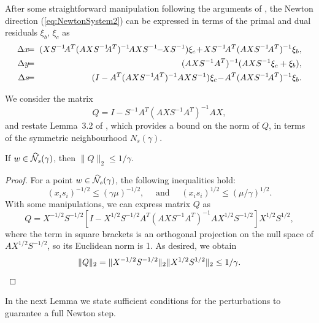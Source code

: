 After some straightforward manipulation following the arguments of 
\cite{GondzioGrothey03}, the Newton
direction (\ref{eq:NewtonSystem2}) can be expressed in terms 
of the primal and dual residuals $\xi_b$, $\xi_c$ as
%
\begin{eqnarray}  \label{eq:Directions}
  \Delta x & \hspace{-1ex} = \hspace{-1ex} & 
  (XS^{-1} \! A^T (AXS^{-1} \!\! A^T)^{-1} \! AXS^{-1} \!\!-\!\! XS^{-1} )\xi_c
  \! + \! XS^{-1} \! A^T (AXS^{-1} \! A^T)^{-1} \xi_b, \nonumber \\
  \Delta y & \hspace{-1ex} = \hspace{-1ex} & 
  (AXS^{-1} A^T)^{-1} (AXS^{-1} \xi_c + \xi_b),                  \\
  \Delta s & \hspace{-1ex} = \hspace{-1ex} & 
  (I - A^T (AXS^{-1} \! A^T)^{-1} AXS^{-1} )\xi_c 
  \! - \! A^T (AXS^{-1} \! A^T)^{-1} \xi_b.            \nonumber
\end{eqnarray}

We consider the matrix
\[
  Q = I - S^{-1} A^T (A X S^{-1} A^T)^{-1} A X,
\]
and restate Lemma~3.2 of \cite{GondzioGrothey03},
which provides a bound on the norm of $Q$, in terms of
the symmetric neighbourhood $N_s(\gamma)$.

\begin{lemma}  \label{th:BoundQ}
If $w \in \widehat{\mathcal{N}}_s(\gamma)$, then $\|Q\|_2 \le 1/\gamma$.
\end{lemma}
%
\begin{proof}
For a point $w \in \widehat{\mathcal{N}}_s(\gamma)$, 
the following inequalities hold:
\[
  (x_i s_i)^{-1/2} \le (\gamma\mu)^{-1/2},
  \quad \mbox{ and } \quad
  (x_i s_i)^{1/2} \le (\mu / \gamma)^{1/2}.
\]
With some manipulations, we can express matrix $Q$ as
\[
Q = X^{-1/2}S^{-1/2} \left[ I - X^{1/2}S^{-1/2}A^T(AXS^{-1}A^T)^{-1}AX^{1/2}S^{-1/2} \right] X^{1/2}S^{1/2},
\]
where the term in square brackets is an orthogonal projection on the null
space of $AX^{1/2}S^{-1/2}$, so its Euclidean norm is 1.
As desired, we obtain
\[
  \| Q \|_2 = \| X^{-1/2}S^{-1/2} \|_2 \| X^{1/2}S^{1/2} \|_2 \le 1/\gamma.
  \qedhere
\]
\end{proof}

In the next Lemma we state sufficient conditions for the perturbations
to guarantee a full Newton step.


